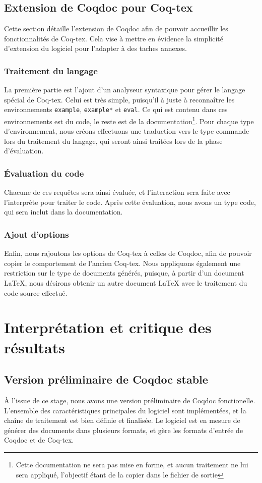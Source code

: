 \documentclass[a4paper, 11pt]{report}
\begin{document}
    \clearpage
    \subsection{Extension de Coqdoc pour Coq-tex}
    \label{coqtex}
    Cette section détaille l'extension de Coqdoc afin de pouvoir accueillir
    les fonctionnalités de Coq-tex. Cela vise à mettre en évidence la simplicité
    d'extension du logiciel pour l'adapter à des taches annexes.
    \subsubsection{Traitement du langage}
    La première partie est l'ajout d'un analyseur syntaxique pour gérer le
    langage spécial de Coq-tex. Celui est très simple, puisqu'il à juste
    à reconnaître les environnements \texttt{example}, \texttt{example*} et
    \texttt{eval}. Ce qui est contenu dans ces environnements est du code, le
    reste est de la documentation\footnote{Cette documentation ne sera pas
    mise en forme, et aucun traitement ne lui sera appliqué, l'objectif étant
    de la copier dans le fichier de sortie}.
    Pour chaque type d'environnement, nous créons effectuons une traduction
    vers le type commande lors du traitement du langage, qui seront ainsi
    traitées lors de la phase d'évaluation.

    \subsubsection{Évaluation du code}
    Chacune de ces requêtes sera ainsi évaluée, et l'interaction sera faite avec
    l'interprète pour traiter le code. Après cette évaluation, nous avons
    un type code, qui sera inclut dans la documentation.
    \subsubsection{Ajout d'options}
    Enfin, nous rajoutons les options de Coq-tex à celles de Coqdoc, afin
    de pouvoir copier le comportement de l'ancien Coq-tex. Nous appliquons
    également une restriction sur le type de documents générés, puisque, à
    partir d'un document LaTeX, nous désirons obtenir un autre document LaTeX avec
    le traitement du code source effectué.
    \clearpage
  \section{Interprétation et critique des résultats}
    \subsection{Version préliminaire de Coqdoc stable}
    À l'issue de ce stage, nous avons une version préliminaire de Coqdoc
    fonctionelle. L'ensemble des caractéristiques principales du logiciel sont
    implémentées, et la chaîne de traitement est bien définie et finalisée.
    Le logiciel est en mesure de générer des documents dans plusieurs formats,
    et gère les formats d'entrée de Coqdoc et de Coq-tex.
\end{document}
